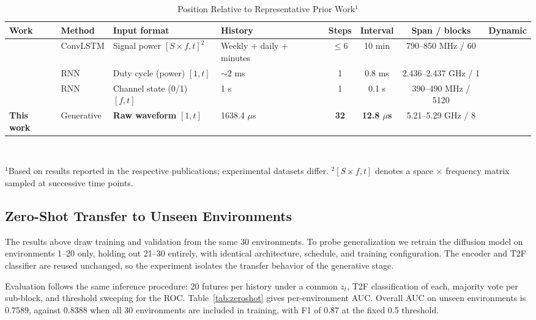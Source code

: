 \documentclass[lettersize,journal]{IEEEtran}
\newcommand{\cmark}{\ding{51}}%
\newcommand{\xmark}{\ding{55}}%
\newcommand{\us}{\ensuremath{\mu}s}
\begin{document}
\begin{table}[!t]
\centering
\caption{Position Relative to Representative Prior Work$^{1}$}
\label{tab:comparison}
\renewcommand{\arraystretch}{1.25}
\begin{tabular}{@{}llp{2.4cm}p{1.7cm}cccc@{}}
\toprule
\textbf{Work} & \textbf{Method} & \textbf{Input format} &
\textbf{History} & \textbf{Steps} & \textbf{Interval} &
\textbf{Span / blocks} & \textbf{Dynamic} \\
\midrule
\cite{Li2021} & ConvLSTM & Signal power $[S\times f, t]^{2}$ &
Weekly + daily + minutes & $\leq 6$ & 10 min & 790--850 MHz / 60 & \xmark \\
\cite{Umebayashi2023} & RNN & Duty cycle (power) $[1,t]$ &
$\sim$2 ms & 1 & 0.8 ms & 2.436--2.437 GHz / 1 & \xmark \\
\cite{Chirov2023} & RNN & Channel state (0/1) $[f,t]$ &
1 s & 1 & 0.1 s & 390--490 MHz / 5120 & \xmark \\
\textbf{This work} & Generative & \textbf{Raw waveform} $[1,t]$ &
1638.4 \us & \textbf{32} & \textbf{12.8 \us} & 5.21--5.29 GHz / 8 &
\cmark \\
\bottomrule
\end{tabular}
\\[2pt]
\parbox{0.95\textwidth}{\footnotesize $^{1}$Based on results reported in
the respective publications; experimental datasets differ.
$^{2}[S \times f, t]$ denotes a space $\times$ frequency matrix sampled
at successive time points.}
\end{table}


\subsection{\textbf{Zero-Shot Transfer to Unseen Environments}}
\label{sec:zeroshot}
The results above draw training and validation from the same 30
environments. To probe generalization we retrain the diffusion model on
environments 1--20 only, holding out 21--30 entirely, with identical
architecture, schedule, and training configuration. The encoder and T2F
classifier are reused unchanged, so the experiment isolates the transfer
behavior of the generative stage.

Evaluation follows the same inference procedure: 20 futures per history
under a common $z_t$, T2F classification of each, majority vote per
sub-block, and threshold sweeping for the ROC. Table~\ref{tab:zeroshot}
gives per-environment AUC. Overall AUC on unseen environments is 0.7589,
against 0.8388 when all 30 environments are included in training, with
F1 of 0.87 at the fixed 0.5 threshold.
\end{document}
